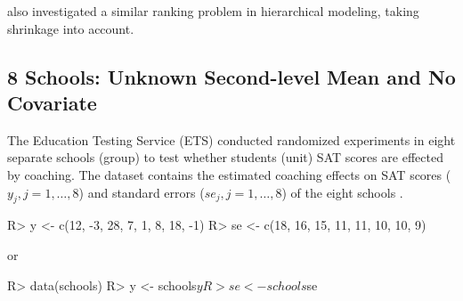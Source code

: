 \documentclass[article]{jss}
\begin{document}



\cite{1995} also investigated a similar ranking problem in hierarchical modeling, taking shrinkage into account.


\subsection[Unknown Second-level Mean and No Covariate]{8 Schools: Unknown Second-level Mean and No Covariate} \label{sec:ex:8schools}

The Education Testing Service (ETS) conducted randomized experiments in eight separate schools (group) to test whether students (unit) SAT scores are effected by coaching. The dataset contains the estimated coaching effects on SAT scores ($y_{j}, j=1, \ldots, 8$) and standard errors ($se_{j}, j=1, \ldots, 8$) of the eight schools \citep{1981}.
\begin{CodeChunk}
\begin{CodeInput}
R> y  <- c(12, -3, 28,  7,  1,  8, 18, -1)
R> se <- c(18, 16, 15, 11, 11, 10, 10,  9)
\end{CodeInput}
\end{CodeChunk}
or
\begin{CodeChunk}
\begin{CodeInput}
R> data(schools)
R> y  <- schools$y
R> se <- schools$se
\end{CodeInput}
\end{CodeChunk}
\end{document}
